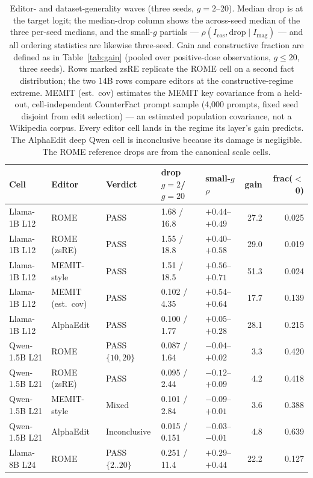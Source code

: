\documentclass[preprint,12pt]{elsarticle}
\begin{document}
\begin{table}[htbp]
\centering
\caption{Editor- and dataset-generality waves (three seeds, $g{=}2$--20). Median drop is
at the target logit; the median-drop column shows the across-seed median of the three
per-seed medians, and the small-$g$ partials --- $\rho(I_{\cos},\mathrm{drop}\mid
I_{\mathrm{mag}})$ --- and all ordering statistics are likewise three-seed. Gain and constructive
fraction are defined as in Table~\ref{tab:gain} (pooled over positive-dose observations,
$g\leq20$, three seeds). Rows marked zsRE replicate the ROME cell on a second fact
distribution; the two 14B rows compare editors at the constructive-regime extreme.
MEMIT (est.\ cov) estimates the MEMIT key covariance from a held-out, cell-independent
CounterFact prompt sample (4{,}000 prompts, fixed seed disjoint from edit selection) ---
an estimated population covariance, not a Wikipedia corpus. Every
editor cell lands in the regime its layer's gain predicts. The AlphaEdit deep Qwen cell
is inconclusive because its damage is negligible. The ROME reference drops are from the
canonical scale cells.}
\label{tab:editors}
{\scriptsize
\setlength{\tabcolsep}{3pt}
\begin{tabular}{lllllrr}
\toprule
Cell & Editor & Verdict & drop $g{=}2$/$g{=}20$ & small-$g$ $\rho$ & gain & frac($<$0) \\
\midrule
Llama-1B L12 & ROME          & PASS & 1.68 / 16.8 & $+0.44$--$+0.49$ & 27.2 & 0.025 \\
Llama-1B L12 & ROME (zsRE)   & PASS & 1.55 / 18.8 & $+0.40$--$+0.58$ & 29.0 & 0.019 \\
Llama-1B L12 & MEMIT-style   & PASS & 1.51 / 18.5 & $+0.56$--$+0.71$ & 51.3 & 0.024 \\
Llama-1B L12 & MEMIT (est.\ cov) & PASS & 0.102 / 4.35 & $+0.54$--$+0.64$ & 17.7 & 0.139 \\
Llama-1B L12 & AlphaEdit     & PASS & 0.100 / 1.77 & $+0.05$--$+0.28$ & 28.1 & 0.215 \\
Qwen-1.5B L21 & ROME         & PASS $\{10,20\}$ & 0.087 / 1.64 & $-0.04$--$+0.02$ & 3.3 & 0.420 \\
Qwen-1.5B L21 & ROME (zsRE)  & PASS & 0.095 / 2.44 & $-0.12$--$+0.09$ & 4.2 & 0.418 \\
Qwen-1.5B L21 & MEMIT-style  & Mixed & 0.101 / 2.84 & $-0.09$--$+0.01$ & 3.6 & 0.388 \\
Qwen-1.5B L21 & AlphaEdit    & Inconclusive & 0.015 / 0.151 & $-0.03$--$-0.01$ & 4.8 & 0.639 \\
Llama-8B L24 & ROME          & PASS $\{2..20\}$ & 0.251 / 11.4 & $+0.29$--$+0.44$ & 22.2 & 0.127 \\

\end{tabular}}
\end{table}
\end{document}
